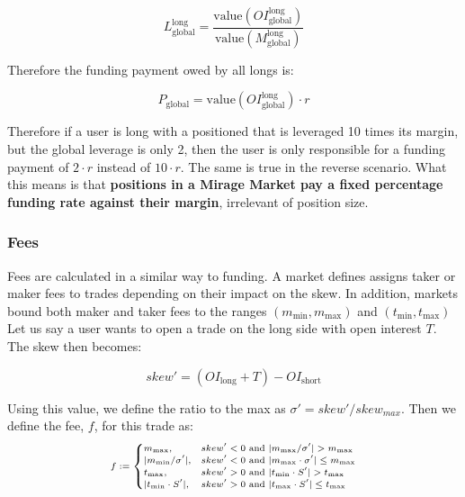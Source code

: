 \documentclass[letterpaper]{article}
\begin{document}
\begin{multicols}{2}
\begin{equation}
    L^{\text{long}}_{\text{global}} = \frac{\text{value}(OI^{\text{long}}_{\text{global}})}{\text{value}(M^{\text{long}}_{\text{global}})} 
\end{equation}

Therefore the funding payment owed by all longs is:

\begin{equation}
    P_{\text{global}} = \text{value}(OI^{\text{long}}_{\text{global}}) \cdot r
\end{equation}

Therefore if a user is long with a positioned that is leveraged 10 times its margin, but the global leverage is only 2, then the user is only responsible for a funding payment of $2 \cdot r$ instead of $10 \cdot r$. The same is true in the reverse scenario. What this means is that \textbf{positions in a Mirage Market pay a fixed percentage funding rate against their margin}, irrelevant of position size.

\subsubsection{Fees}

Fees are calculated in a similar way to funding. A market defines assigns taker or maker fees to trades depending on their impact on the skew. In addition, markets bound both maker and taker fees to the ranges $(m_{\text{min}}, m_{\text{max}})$ and $(t_{\text{min}}, t_{\text{max}})$ Let us say a user wants to open a trade on the long side with open interest $T$. The skew then becomes:

\begin{equation}
    \label{eq:new-skew}
    skew' = (OI_{\text{long}} + T) - OI_{\text{short}}
\end{equation}

Using this value, we define the ratio to the max as $\sigma' = skew' / skew_{max}$. Then we define the fee, $f$, for this trade as:
\scalebox{0.5}{}
\begin{equation}
    \text{\scriptsize $f := \begin{cases}
        m_{\text{max}}, & skew' < 0 \text{ and } |m_{\text{max}} / \sigma'| > m_{\text{max}} \\
        |m_{\text{min}} / \sigma'|, & skew' < 0 \text{ and } |m_{\text{max}} \cdot \sigma'| \leq m_{\text{max}} \\
        t_{\text{max}}, & skew' > 0 \text{ and } |t_{\text{min}} \cdot S'| > t_{\text{max}} \\
        |t_{\text{min}} \cdot S'|, & skew' > 0 \text{ and } |t_{\text{max}} \cdot S'| \leq t_{\text{max}} \\
    \end{cases}$}
\end{equation}


\end{multicols}
\end{document}
